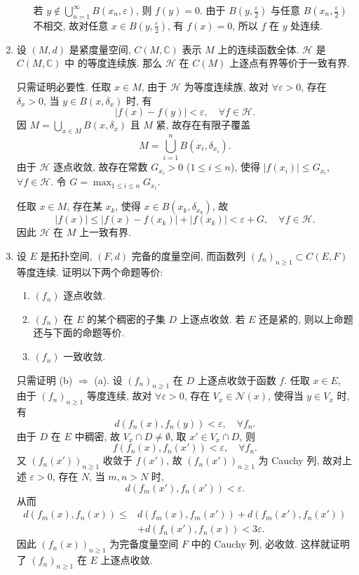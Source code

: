 \begin{enumerate}
\begin{answer}
\begin{enumerate}
        若 $y\notin\bigcup_{n=1}^{\infty} B(x_n,\varepsilon)$, 则 $f(y)=0$.
        由于 $B(y,\frac{\varepsilon}{2})$ 与任意 $B(x_n,\frac{\varepsilon}{2})$ 不相交,
        故对任意 $x\in B(y,\frac{\varepsilon}{2})$, 有 $f(x)=0$, 所以 $f$ 在 $y$ 处连续.
      \end{enumerate}
    \end{answer}
  \item 设 $(M, d)$ 是紧度量空间, $C(M, \mathbb{C})$ 表示 $M$ 上的连续函数全体. $\mathcal{H}$ 是 $C(M, \mathbb{C})$ 中 的等度连续族. 那么 $\mathcal{H}$ 在 $C(M)$ 上逐点有界等价于一致有界.
    \begin{answer}
      只需证明必要性.
      任取 $x\in M$, 由于 $\mathcal{H}$ 为等度连续族, 故对 $\forall\varepsilon>0$,
      存在 $\delta_x>0$, 当 $y\in B(x,\delta_x)$ 时, 有
      \[|f(x)-f(y)|<\varepsilon,\quad\forall f\in\mathcal{H}.\]
      因 $M=\bigcup_{x\in M}B(x,\delta_x)$ 且 $M$ 紧, 故存在有限子覆盖
      \[M=\bigcup_{i=1}^n B(x_i,\delta_{x_i}).\]
      由于 $\mathcal{H}$ 逐点收敛, 故存在常数 $G_{x_i}>0$ ($1\leq i\leq n$),
      使得 $|f(x_i)|\leq G_{x_i}$, $\forall f\in\mathcal{H}$.
      令 $G=\max_{1\leq i\leq n}G_{x_i}$.

      任取 $x\in M$, 存在某 $x_k$, 使得 $x\in B(x_k,\delta_{x_k})$, 故
      \[|f(x)|\leq |f(x)-f(x_k)|+|f(x_k)|<\varepsilon+G,\quad\forall f\in\mathcal{H}.\]
      因此 $\mathcal{H}$ 在 $M$ 上一致有界.
    \end{answer}
  \item 设 $E$ 是拓扑空间, $(F, d)$ 完备的度量空间, 而函数列 $\left(f_{n}\right)_{n \geq 1} \subset C(E, F)$ 等度连续. 证明以下两个命题等价:
    \begin{enumerate}
      \item $\left(f_{n}\right)$ 逐点收敛.
      \item $\left(f_{n}\right)$ 在 $E$ 的某个稠密的子集 $D$ 上逐点收敛. 若 $E$ 还是紧的, 则以上命题还与下面的命题等价.
      \item $\left(f_{n}\right)$ 一致收敛.
    \end{enumerate}
    \begin{answer}
      只需证明 (b) $\Rightarrow$ (a).
      设 $(f_n)_{n\geq 1}$ 在 $D$ 上逐点收敛于函数 $f$. 任取 $x\in E$,
      由于 $(f_n)_{n\geq 1}$ 等度连续, 故对 $\forall\varepsilon>0$,
      存在 $V_x\in\mathcal{N}(x)$, 使得当 $y\in V_x$ 时, 有
      \[d(f_n(x),f_n(y))<\varepsilon,\quad\forall f_n.\]
      由于 $D$ 在 $E$ 中稠密, 故 $V_x\cap D\neq\emptyset$,
      取 $x'\in V_x\cap D$, 则
      \[f(f_n(x),f_n(x'))<\varepsilon,\quad\forall f_n.\]
      又 $(f_n(x'))_{n\geq 1}$ 收敛于 $f(x')$, 故 $(f_n(x'))_{n\geq 1}$ 为 Cauchy 列,
      故对上述 $\varepsilon>0$, 存在 $N$, 当 $m,n>N$ 时,
      \[d(f_m(x'),f_n(x'))<\varepsilon.\]
      从而
      \begin{align*}
          d(f_m(x),f_n(x))
          \leq{} & d(f_m(x),f_m(x'))+d(f_m(x'),f_n(x')) \\
                  & +d(f_n(x'),f_n(x))<3\varepsilon.
      \end{align*}
      因此 $(f_n(x))_{n\geq 1}$ 为完备度量空间 $F$ 中的 Cauchy 列, 必收敛.
      这样就证明了 $(f_n)_{n\geq 1}$ 在 $E$ 上逐点收敛.


\end{answer}
\end{enumerate}
